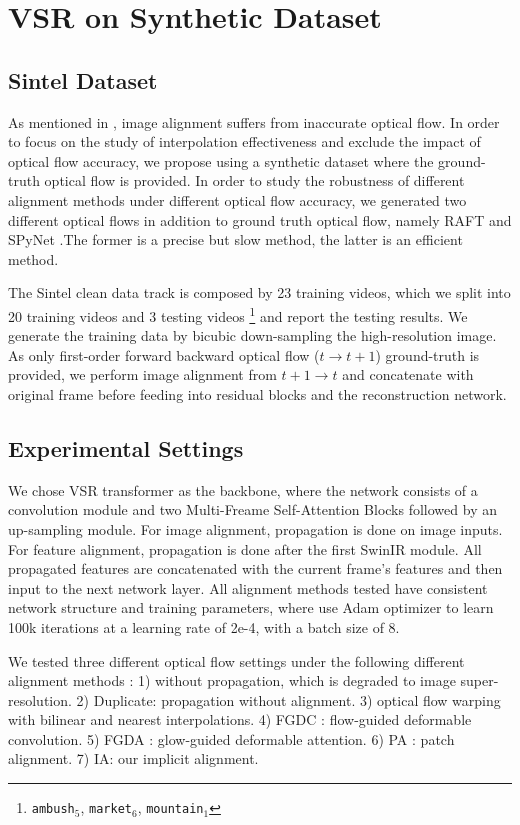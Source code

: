 \documentclass[10pt,twocolumn,letterpaper]{article}
\begin{document}
\section{VSR on Synthetic Dataset}
\subsection{Sintel Dataset} 
As mentioned in \cite{chan2021basicvsr}, image alignment suffers from inaccurate optical flow. In order to focus on the study of interpolation effectiveness and exclude the impact of optical flow accuracy, we propose using a synthetic dataset where the ground-truth optical flow is provided. In order to study the robustness of different alignment methods under different optical flow accuracy, we generated two different optical flows in addition to ground truth optical flow, namely RAFT \cite{teed2020raft} and SPyNet \cite{ranjan2017optical_spynet}.The former is a precise but slow method, the latter is an efficient method.

The Sintel clean data track is composed by 23 training videos, which we split into 20 training videos and 3 testing videos \footnote{\texttt{ambush$_\text{5}$}, \texttt{market$_\text{6}$}, \texttt{mountain$_\text{1}$}} and report the testing results. We generate the training data by bicubic down-sampling the high-resolution image.
As only first-order forward backward optical flow ($t \rightarrow t+1$) ground-truth is provided, we perform image alignment from $t+1 \rightarrow t$ and concatenate with original frame before feeding into residual blocks and the reconstruction network. 

\subsection{Experimental Settings}
We chose VSR transformer as the backbone, where the network consists of a convolution module and two Multi-Freame Self-Attention Blocks \cite{shi2022rethinking} followed by an up-sampling module. For image alignment, propagation is done on image inputs. For feature alignment, propagation is done after the first SwinIR module.  All propagated features are concatenated with the current frame’s features and then input to the next network layer. All alignment methods tested have consistent network structure and training parameters, where use Adam optimizer to learn 100k iterations at a learning rate of 2e-4, with a batch size of 8.

We tested three different optical flow settings under the following different alignment methods : 1) without propagation, which is degraded to image super-resolution. 2) Duplicate: propagation without alignment. 3) optical flow warping with bilinear and nearest interpolations. 4) FGDC \cite{wang2019edvr}: flow-guided deformable convolution. 5) FGDA \cite{liang2022recurrent_rvrt}: glow-guided deformable attention. 6) PA \cite{shi2022rethinking}: patch alignment. 7) IA: our implicit alignment.
\end{document}
